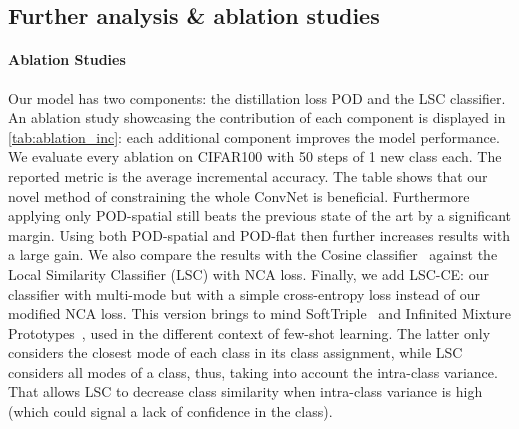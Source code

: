 


\subsection{Further analysis \& ablation studies}
\label{sec:podnet_ablation}

\paragraph{Ablation Studies}
Our model has two components: the distillation loss POD and the LSC classifier. An ablation study
showcasing the contribution of each component is displayed in \autoref{tab:ablation_inc}: each
additional component improves the model performance. We evaluate every ablation on CIFAR100 with 50
steps of 1 new class each. The reported metric is the average incremental accuracy. The table shows
that our novel method of constraining the whole ConvNet is beneficial. Furthermore applying only
POD-spatial still beats the previous state of the art by a significant margin. Using both
POD-spatial and POD-flat then further increases results with a large gain. We also compare the
results with the Cosine classifier~\citep{luo2018cosine_classifier,hou2019ucir} against the Local
Similarity Classifier (LSC) with NCA loss. Finally, we add LSC-CE: our classifier with multi-mode
but with a simple cross-entropy loss instead of our modified NCA loss. This version brings to mind
SoftTriple~\citep{qian2019softtriple} and Infinited Mixture
Prototypes~\citep{allen2019infinitemixtureproto}, used in the different context of few-shot
learning.
The latter only considers the closest mode of each class in its class assignment, while LSC
considers all modes of a class, thus, taking into account the intra-class variance. That allows LSC
to decrease class similarity when intra-class variance is high (which could signal a lack of
confidence in the class).

\label{sec:ablation_pooling}
